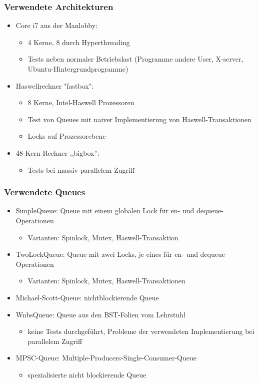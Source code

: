 \documentclass[svgnames]{beamer}
\begin{document}
\begin{frame}
\frametitle{Verwendete Architekturen}
\begin{itemize}
 \item Core i7 aus der Manlobby:
\begin{itemize}
 \item 4 Kerne, 8 durch Hyperthreading
 \item Tests neben normaler Betriebslast (Programme andere User, X-server, Ubuntu-Hintergrundprogramme)
\end{itemize}
 \item Haswellrechner "fastbox":
\begin{itemize}
 \item 8 Kerne, Intel-Haswell Prozessoren
 \item Test von Queues mit naiver Implementierung von Haswell-Transaktionen
 \item Locks auf Prozessorebene
\end{itemize}
 \item 48-Kern Rechner ,,bigbox'':
\begin{itemize}
 \item Tests bei massiv parallelem Zugriff
\end{itemize}
\end{itemize}
\end{frame}

\begin{frame}
\frametitle{Verwendete Queues}
\begin{itemize}
 \item SimpleQueue: Queue mit einem globalen Lock f\"ur en- und dequeue-Operationen
\begin{itemize}
 \item Varianten: Spinlock, Mutex, Haswell-Transaktion
\end{itemize}
 \item TwoLockQueue: Queue mit zwei Locks, je eines f\"ur en- und dequeue Operationen
\begin{itemize}
 \item Varianten: Spinlock, Mutex, Haswell-Transaktionen
\end{itemize}
 \item Michael-Scott-Queue: nichtblockierende Queue
 \item WnbsQueue: Queue aus den BST-Folien vom Lehrstuhl
\begin{itemize}
\item keine Tests durchgef\"uhrt, Probleme der verwendeten Implementierung bei parallelem Zugriff
\end{itemize}
 \item MPSC-Queue: Multiple-Producers-Single-Consumer-Queue
\begin{itemize}
\item spezialisierte nicht blockierende Queue
\end{itemize}
\end{itemize}
\end{frame}
\end{document}
